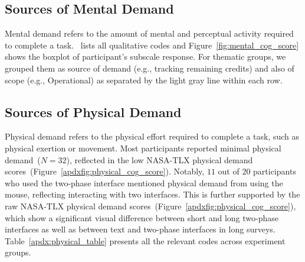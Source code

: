 \subsection{Sources of Mental Demand}
\label{apdx:mental}
Mental demand refers to the amount of mental and perceptual activity required to complete a task.~ lists all qualitative codes and Figure~\ref{fig:mental_cog_score} shows the boxplot of participant's subscale response. For thematic groups, we grouped them as source of demand (e.g., tracking remaining credits) and also of scope (e.g., Operational) as separated by the light gray line within each row.

\subsection{Sources of Physical Demand} 
\label{apdx:physical}
Physical demand refers to the physical effort required to complete a task, such as physical exertion or movement. Most participants reported minimal physical demand~($N=32$), reflected in the low NASA-TLX physical demand scores~(Figure~\ref{apdxfig:physical_cog_score}). Notably, $11$ out of $20$ participants who used the two-phase interface mentioned physical demand from using the mouse, reflecting interacting with two interfaces. This is further supported by the raw NASA-TLX physical demand scores~(Figure~\ref{apdxfig:physical_cog_score}), which show a significant visual difference between short and long two-phase interfaces as well as between text and two-phase interfaces in long surveys. Table~\ref{apdx:physical_table} presents all the relevant codes across experiment groups.





